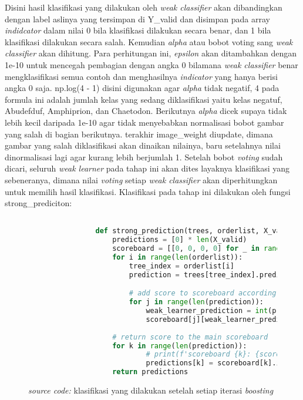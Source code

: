 		Disini hasil klasifikasi yang dilakukan oleh \emph{weak classifier} akan dibandingkan 
		dengan label aslinya yang tersimpan di Y\_valid dan disimpan pada array \emph{indidcator} 
		dalam nilai 0 bila klasifikasi dilakukan secara benar, dan 1 bila klasifikasi dilakukan 
		secara salah. Kemudian \textit{alpha} atau bobot voting sang \emph{weak classifier} 
		akan dihitung. Para perhitungan ini, \emph{epsilon} akan ditambahkan dengan 1e-10 
		untuk mencegah pembagian dengan angka 0 bilamana \emph{weak classifier} benar mengklasifikasi 
		semua contoh dan menghasilnya \emph{indicator} yang hanya berisi angka 0 saja. np.log(4 - 1) 
		disini digunakan agar \emph{alpha} tidak negatif, 4 pada formula ini adalah jumlah kelas 
		yang sedang diklasifikasi yaitu kelas negatuf, Abudefduf, Amphiprion, dan Chaetodon. Berikutnya 
		\emph{alpha} dicek supaya tidak lebih kecil daripada 1e-10 agar tidak menyebabkan normalisasi 
		bobot gambar yang salah di bagian berikutnya. terakhir image\_weight diupdate, dimana gambar 
		yang salah diklasifikasi akan dinaikan nilainya, baru setelahnya nilai dinormalisasi lagi 
		agar kurang lebih berjumlah 1. Setelah bobot \textit{voting} sudah dicari, seluruh 
		\emph{weak learner} pada tahap ini akan dites layaknya klasifikasi yang sebeneranya, dimana 
		nilai \textit{voting} setiap \emph{weak classifier} akan diperhitungkan untuk memilih 
		hasil klasifikasi. Klasifikasi pada tahap ini dilakukan oleh fungsi strong\_prediciton:

		\begin{figure}[H]
			\begin{lstlisting}[language=Python, basicstyle=\tiny]

				def strong_prediction(trees, orderlist, X_valid, alpha_list):
					predictions = [0] * len(X_valid)
					scoreboard = [[0, 0, 0, 0] for _ in range(len(X_valid))]
					for i in range(len(orderlist)):
						tree_index = orderlist[i]
						prediction = trees[tree_index].predict(X_valid)

						# add score to scoreboard according to results and alpha value of tree
						for j in range(len(prediction)):
							weak_learner_prediction = int(prediction[j])
							scoreboard[j][weak_learner_prediction] += 1 * alpha_list[i]
					
					# return score to the main scoreboard
					for k in range(len(prediction)):
							# print(f'scoreboard {k}: {scoreboard[k]}')
							predictions[k] = scoreboard[k].index(max(scoreboard[k]))
					return predictions

			\end{lstlisting}
			\caption{\emph{source code:} klasifikasi yang dilakukan setelah setiap iterasi \emph{boosting}}
			\label{code: strong prediction}
		\end{figure}


